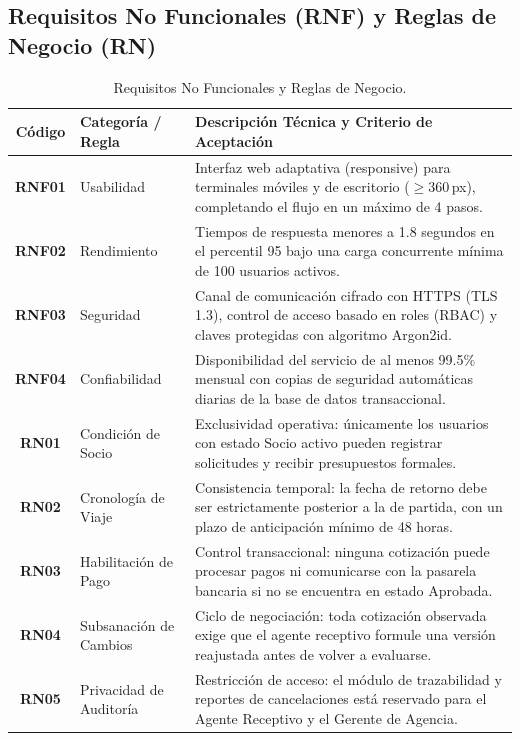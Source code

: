 \subsection{Requisitos No Funcionales (RNF) y Reglas de Negocio (RN)}
\begin{table}[H]
\centering
\footnotesize
\begin{tabularx}{\textwidth}{clL}
\toprule
\textbf{Código} & \textbf{Categoría / Regla} & \textbf{Descripción Técnica y Criterio de Aceptación} \\ \midrule
\textbf{RNF01} & Usabilidad & Interfaz web adaptativa (responsive) para terminales móviles y de escritorio ($\ge 360$\,px), completando el flujo en un máximo de 4 pasos. \\ \midrule
\textbf{RNF02} & Rendimiento & Tiempos de respuesta menores a 1.8 segundos en el percentil 95 bajo una carga concurrente mínima de 100 usuarios activos. \\ \midrule
\textbf{RNF03} & Seguridad & Canal de comunicación cifrado con HTTPS (TLS 1.3), control de acceso basado en roles (RBAC) y claves protegidas con algoritmo Argon2id. \\ \midrule
\textbf{RNF04} & Confiabilidad & Disponibilidad del servicio de al menos 99.5\% mensual con copias de seguridad automáticas diarias de la base de datos transaccional. \\ \midrule
\textbf{RN01} & Condición de Socio & Exclusividad operativa: únicamente los usuarios con estado Socio activo pueden registrar solicitudes y recibir presupuestos formales. \\ \midrule
\textbf{RN02} & Cronología de Viaje & Consistencia temporal: la fecha de retorno debe ser estrictamente posterior a la de partida, con un plazo de anticipación mínimo de 48 horas. \\ \midrule
\textbf{RN03} & Habilitación de Pago & Control transaccional: ninguna cotización puede procesar pagos ni comunicarse con la pasarela bancaria si no se encuentra en estado Aprobada. \\ \midrule
\textbf{RN04} & Subsanación de Cambios & Ciclo de negociación: toda cotización observada exige que el agente receptivo formule una versión reajustada antes de volver a evaluarse. \\ \midrule
\textbf{RN05} & Privacidad de Auditoría & Restricción de acceso: el módulo de trazabilidad y reportes de cancelaciones está reservado para el Agente Receptivo y el Gerente de Agencia. \\ \bottomrule
\end{tabularx}
\caption{Requisitos No Funcionales y Reglas de Negocio.}\label{tab:rn_rnf}
\end{table}

